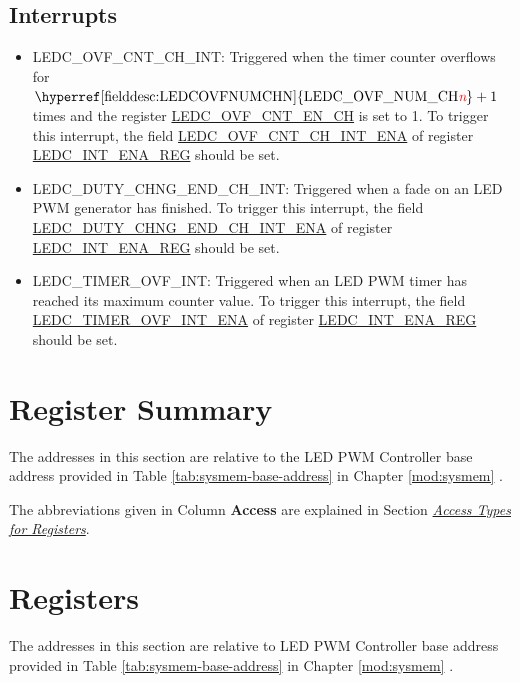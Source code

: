 \documentclass[main\_\_EN.tex]{subfiles}
\begin{document}
\subsection{Interrupts}
\begin{itemize}
\item \label{int:ledc-ovf-cnt}LEDC\_OVF\_CNT\_CH\_INT: Triggered when the timer counter overflows for $ \textrm{\hyperref[fielddesc:LEDCOVFNUMCHN]{LEDC\_OVF\_NUM\_CH\regindex{n}}} + 1 $ times and the register \hyperref[fielddesc:LEDCOVFCNTENCHN]{LEDC\_OVF\_CNT\_EN\_CH} is set to 1. To trigger this interrupt, the field \hyperref[fielddesc:LEDCOVFCNTCHNINTENA]{LEDC\_OVF\_CNT\_CH\_INT\_ENA} of register \hyperref[regdesc:LEDCINTENAREG]{LEDC\_INT\_ENA\_REG} should be set.
\item \label{int:ledc-duty-chng-end}LEDC\_DUTY\_CHNG\_END\_CH\_INT: Triggered when a fade on an LED PWM generator has finished. To trigger this interrupt, the field \hyperref[fielddesc:LEDCDUTYCHNGENDCHNINTENA]{LEDC\_DUTY\_CHNG\_END\_CH\_INT\_ENA} of register \hyperref[regdesc:LEDCINTENAREG]{LEDC\_INT\_ENA\_REG} should be set.
\item \label{int:ledc-timer-ovf}LEDC\_TIMER\_OVF\_INT: Triggered when an LED PWM timer has reached its maximum counter value. To trigger this interrupt, the field \hyperref[fielddesc:LEDCTIMERXOVFINTENA]{LEDC\_TIMER\_OVF\_INT\_ENA} of register \hyperref[regdesc:LEDCINTENAREG]{LEDC\_INT\_ENA\_REG} should be set.
\end{itemize}



\clearpage
\hypertarget{ledc-reg-summ}{}
\section{Register Summary}
\label{sec:ledc-reg-summ}


The addresses in this section are relative to the LED PWM Controller base address provided in Table \ref{tab:sysmem-base-address} in Chapter \ref{mod:sysmem} \textit{}.

The abbreviations given in Column \textbf{Access} are explained in Section \hyperref[glossary-access-types]{\textit{Access Types for Registers}}.





\clearpage
\section{Registers}
\label{sec:ledc-reg-field}

The addresses in this section are relative to LED PWM Controller base address provided in Table \ref{tab:sysmem-base-address} in Chapter \ref{mod:sysmem} \textit{}.


\end{document}
